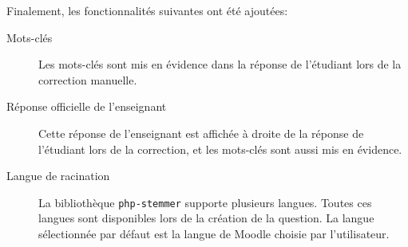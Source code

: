 Finalement, les fonctionnalit\'es suivantes ont \'et\'e ajout\'ees:
\begin{description}
  \item[Mots-cl\'es]
  
  Les mots-cl\'es sont mis en \'evidence dans la r\'eponse de l'\'etudiant lors de la correction manuelle.
  
  \item[R\'eponse officielle de l'enseignant]
  
  Cette r\'eponse de l'enseignant est 
  affich\'ee \`a droite de la r\'eponse de l'\'etudiant lors de la correction, et
  les mots-cl\'es sont aussi mis en \'evidence.
  
  \item[Langue de racination]
  
  La biblioth\`eque \texttt{php-stemmer} supporte plusieurs langues.
  Toutes ces langues sont disponibles lors de la cr\'eation de la question.
  La langue s\'electionn\'ee par d\'efaut est la langue de Moodle choisie par l'utilisateur.
\end{description}
